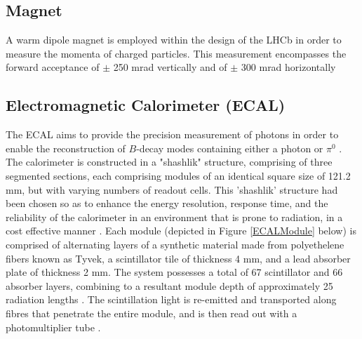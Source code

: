 \subsection{Magnet} 
A warm dipole magnet is employed within the design of the LHCb in order to measure the momenta of charged particles. This measurement 
encompasses the forward acceptance of $\pm$ 250 mrad vertically and of $\pm$ 300 mrad horizontally
\subsection{Electromagnetic Calorimeter (ECAL)}
The ECAL aims to provide the precision measurement of photons in order to enable the reconstruction of $B$-decay modes containing either a photon or $\pi^{0}$ \cite{GOLUTVIN2003258}.
The calorimeter is constructed in a "shashlik" structure, comprising of three segmented sections, each comprising modules of an identical square size of 121.2 mm, but with varying numbers of
readout cells. This 'shashlik' structure had been chosen so as to enhance the energy resolution, response time, and the reliability of the calorimeter in an environment that is prone to radiation, in a cost effective manner \cite{Amato:494264}. Each module (depicted in Figure \ref{ECALModule} below) is comprised of alternating layers of a synthetic material made from polyethelene fibers known as Tyvek, a scintillator tile of thickness 4 mm, and a lead absorber plate of thickness 2 mm.
The system possesses a total of 67 scintillator and 66 absorber layers, combining to a resultant module depth of approximately 25 radiation lengths \cite{AbellanBeteta:2020amj}. The scintillation light is re-emitted and transported along fibres that penetrate the entire
module, and is then read out with a photomultiplier tube \cite{AbellanBeteta:2020amj}.
